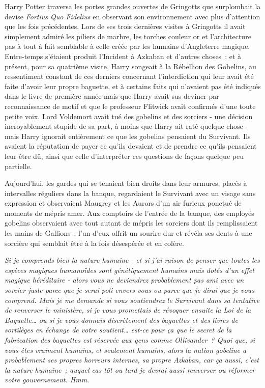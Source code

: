 Harry Potter traversa les portes grandes ouvertes de Gringotts que surplombait la devise \emph{Fortius Quo Fidelius} en observant son environnement avec plus d'attention que les fois précédentes. Lors de ses trois dernières visites à Gringotts il avait simplement admiré les piliers de marbre, les torches couleur or et l'architecture pas à tout à fait semblable à celle créée par les humains d'Angleterre magique. Entre-temps s'étaient produit l'Incident à Azkaban et d'autres choses~; et à présent, pour sa quatrième visite, Harry songeait à la Rébellion des Gobelins, au ressentiment constant de ces derniers concernant l'interdiction qui leur avait été faite d'avoir leur propre baguette, et à certains faits qui n'avaient pas été indiqués dans le livre de première année mais que Harry avait sus deviner par reconnaissance de motif et que le professeur Flitwick avait confirmés d'une toute petite voix. Lord Voldemort avait tué des gobelins et des sorciers - une décision incroyablement stupide de sa part, à moins que Harry ait raté quelque chose - mais Harry ignorait entièrement ce que les gobelins pensaient du Survivant. Ils avaient la réputation de payer ce qu'ils devaient et de prendre ce qu'ils pensaient leur être dû, ainsi que celle d'interpréter ces questions de façons quelque peu partielle.

Aujourd'hui, les gardes qui se tenaient bien droits dans leur armures, placés à intervalles réguliers dans la banque, regardaient le Survivant avec un visage sans expression et observaient Maugrey et les Aurors d'un air furieux ponctué de moments de mépris amer. Aux comptoirs de l'entrée de la banque, des employés gobelins observaient avec tout autant de mépris les sorciers dont ils remplissaient les mains de Gallions~; l'un d'eux offrit un sourire dur et révéla ses dents à une sorcière qui semblait être à la fois désespérée et en colère.

\emph{Si je comprends bien la nature humaine - et si j'ai raison de penser que toutes les espèces magiques humanoïdes sont génétiquement humains mais dotés d'un effet magique héréditaire - alors vous ne deviendrez probablement pas ami avec un sorcier juste parce que je serai poli envers vous ou parce que je dirai que je vous comprend. Mais je me demande si vous soutiendrez le Survivant dans sa tentative de renverser le ministère, si je vous promettais de révoquer ensuite la Loi de la Baguette… ou si je vous donnais discrètement des baguettes et des livres de sortilèges en échange de votre soutient… est-ce pour ça que le secret de la fabrication des baguettes est réservée aux gens comme Ollivander~? Quoi que, si vous êtes vraiment humains, et seulement humains, alors la nation gobeline a probablement ses propres horreurs internes, sa propre Azkaban, car ça aussi, c'est la nature humaine~; auquel cas tôt ou tard je devrai aussi renverser ou réformer votre gouvernement. Hmm.}

